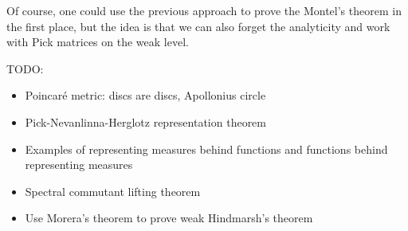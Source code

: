 Of course, one could use the previous approach to prove the Montel's theorem in the first place, but the idea is that we can also forget the analyticity and work with Pick matrices on the weak level.

TODO:
\begin{itemize}
	\item Poincaré metric: discs are discs, Apollonius circle
	\item Pick-Nevanlinna-Herglotz representation theorem
	\item Examples of representing measures behind functions and functions behind representing measures
	\item Spectral commutant lifting theorem
	\item Use Morera's theorem to prove weak Hindmarsh's theorem
\end{itemize}

